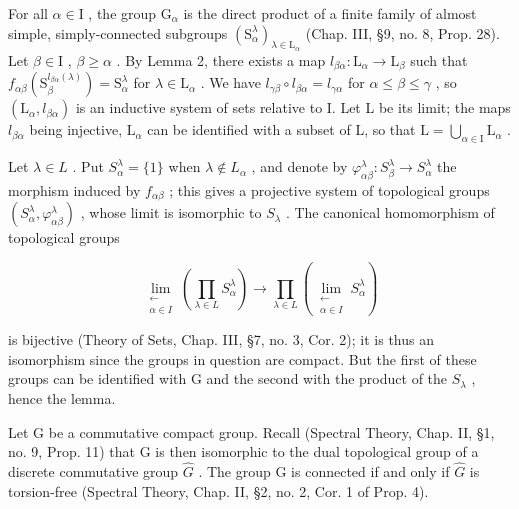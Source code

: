 For all \(\alpha \in \mathrm{I}\) , the group \(\mathrm{G}_{\alpha}\) is the direct product of a finite family of almost simple, simply-connected subgroups \((\mathrm{S}_{\alpha}^{\lambda})_{\lambda \in \mathrm{L}_{\alpha}}\) (Chap. III, §9, no. 8, Prop. 28). Let \(\beta \in \mathrm{I}\) , \(\beta \geq \alpha\) . By Lemma 2, there exists a map \(l_{\beta \alpha}: \mathrm{L}_{\alpha} \to \mathrm{L}_{\beta}\) such that \(f_{\alpha \beta}(\mathrm{S}_{\beta}^{l_{\beta \alpha}(\lambda)}) = \mathrm{S}_{\alpha}^{\lambda}\) for \(\lambda \in \mathrm{L}_{\alpha}\) . We have \(l_{\gamma \beta} \circ l_{\beta \alpha} = l_{\gamma \alpha}\) for \(\alpha \leq \beta \leq \gamma\) , so \((\mathrm{L}_{\alpha}, l_{\beta \alpha})\) is an inductive system of sets relative to I. Let L be its limit; the maps \(l_{\beta \alpha}\) being injective, \(\mathrm{L}_{\alpha}\) can be identified with a subset of L, so that \(\mathrm{L} = \bigcup_{\alpha \in \mathrm{I}} \mathrm{L}_{\alpha}\) .

Let \(\lambda \in L\) . Put \(S_{\alpha}^{\lambda} = \{1\}\) when \(\lambda \notin L_{\alpha}\) , and denote by \(\varphi_{\alpha \beta}^{\lambda}: S_{\beta}^{\lambda} \to S_{\alpha}^{\lambda}\) the morphism induced by \(f_{\alpha \beta}\) ; this gives a projective system of topological groups \((S_{\alpha}^{\lambda}, \varphi_{\alpha \beta}^{\lambda})\) , whose limit is isomorphic to \(S_{\lambda}\) . The canonical homomorphism of topological groups

\[
\lim_{\substack{\longleftarrow \\ \alpha \in I}}\left(\prod_{\lambda \in L}S_{\alpha}^{\lambda}\right)\to \prod_{\lambda \in L}\left(\lim_{\substack{\longleftarrow \\ \alpha \in I}}S_{\alpha}^{\lambda}\right)
\]

is bijective (Theory of Sets, Chap. III, §7, no. 3, Cor. 2); it is thus an isomorphism since the groups in question are compact. But the first of these groups can be identified with G and the second with the product of the \(S_{\lambda}\) , hence the lemma.


Let G be a commutative compact group. Recall (Spectral Theory, Chap. II, §1, no. 9, Prop. 11) that G is then isomorphic to the dual topological group of a discrete commutative group \(\hat{G}\) . The group G is connected if and only if \(\hat{G}\) is torsion-free (Spectral Theory, Chap. II, §2, no. 2, Cor. 1 of Prop. 4).

